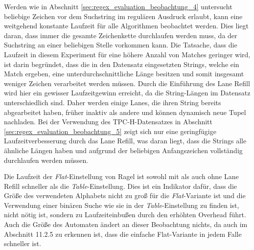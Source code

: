 Werden wie in Abschnitt \ref{sec:regex_evaluation_beobachtung_4} untersucht beliebige Zeichen vor dem Suchstring im regulären Ausdruck erlaubt, kann eine weitgehend konstante Laufzeit für alle Algorithmen beobachtet werden.
Dies liegt daran, dass immer die gesamte Zeichenkette durchlaufen werden muss, da der Suchstring an einer beliebigen Stelle vorkommen kann.
Die Tatsache, dass die Laufzeit in diesem Experiment für eine höhere Anzahl von Matches geringer wird, ist darin begründet, dass die in den Datensatz eingesetzten Strings, welche ein Match ergeben, eine unterdurchschnittliche Länge besitzen und somit insgesamt weniger Zeichen verarbeitet werden müssen.
Durch die Einführung des Lane Refill wird hier ein gewisser Laufzeitgewinn erreicht, da die String-Längen im Datensatz unterschiedlich sind.
Daher werden einige Lanes, die ihren String bereits abgearbeitet haben, früher inaktiv als andere und können dynamisch neue Tupel nachladen.
Bei der Verwendung des TPC-H-Datensatzes in Abschnitt \ref{sec:regex_evaluation_beobachtung_5} zeigt sich nur eine geringfügige Laufzeitverbesserung durch das Lane Refill, was daran liegt, dass die Strings alle ähnliche Längen haben und aufgrund der beliebigen Anfangszeichen vollständig durchlaufen werden müssen.

Die Laufzeit der \emph{Flat}-Einstellung von Ragel ist sowohl mit als auch ohne Lane Refill schneller als die \emph{Table}-Einstellung.
Dies ist ein Indikator dafür, dass die Größe des verwendeten Alphabets nicht zu groß für die \emph{Flat}-Variante ist und die Verwendung einer binären Suche wie sie in der \emph{Table}-Einstellung zu finden ist, nicht nötig ist, sondern zu Laufzeiteinbußen durch den erhöhten Overhead führt.
Auch die Größe des Automaten ändert an dieser Beobachtung nichts, da auch im Abschnitt 11.2.5 zu erkennen ist, dass die einfache Flat-Variante in jedem Falle schneller ist.